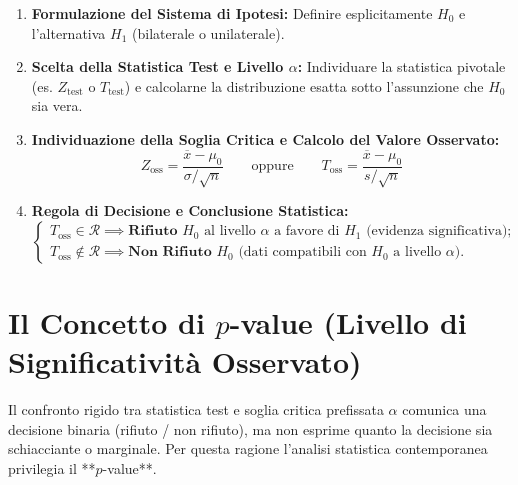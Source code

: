 \begin{metodo}
\begin{enumerate}
    \item \textbf{Formulazione del Sistema di Ipotesi:} Definire esplicitamente $H_0$ e l'alternativa $H_1$ (bilaterale o unilaterale).
    \item \textbf{Scelta della Statistica Test e Livello $\alpha$:} Individuare la statistica pivotale (es. $Z_{\text{test}}$ o $T_{\text{test}}$) e calcolarne la distribuzione esatta sotto l'assunzione che $H_0$ sia vera.
    \item \textbf{Individuazione della Soglia Critica e Calcolo del Valore Osservato:}
    \begin{equation}
        Z_{\text{oss}} = \frac{\overline{x} - \mu_0}{\sigma / \sqrt{n}} \qquad \text{oppure} \qquad T_{\text{oss}} = \frac{\overline{x} - \mu_0}{s / \sqrt{n}}
    \end{equation}
    \item \textbf{Regola di Decisione e Conclusione Statistica:}
    \begin{equation}
        \begin{cases}
            T_{\text{oss}} \in \mathcal{R} \implies \textbf{Rifiuto } H_0 \text{ al livello } \alpha \text{ a favore di } H_1 \text{ (evidenza significativa);} \\
            T_{\text{oss}} \notin \mathcal{R} \implies \textbf{Non Rifiuto } H_0 \text{ (dati compatibili con } H_0 \text{ a livello } \alpha).
        \end{cases}
    \end{equation}
\end{enumerate}
\end{metodo}

\section{Il Concetto di $p$-value (Livello di Significatività Osservato)}
\label{sec:p_value_teoria}

Il confronto rigido tra statistica test e soglia critica prefissata $\alpha$ comunica una decisione binaria (rifiuto / non rifiuto), ma non esprime quanto la decisione sia schiacciante o marginale. Per questa ragione l'analisi statistica contemporanea privilegia il **$p$-value**.


